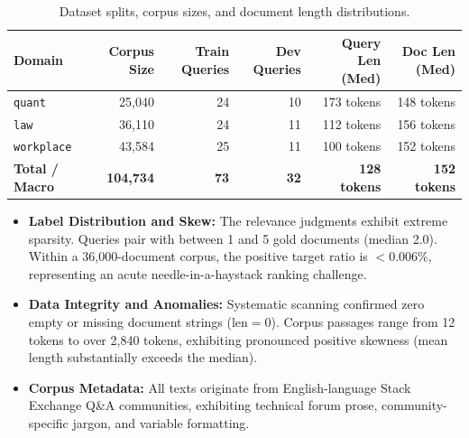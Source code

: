 \begin{table}[h]
\centering
\small
\caption{Dataset splits, corpus sizes, and document length distributions.}
\label{tab:dataset_stats}
\begin{tabular}{lrrrrr}
\toprule
\textbf{Domain} & \textbf{Corpus Size} & \textbf{Train Queries} & \textbf{Dev Queries} & \textbf{Query Len (Med)} & \textbf{Doc Len (Med)} \\
\midrule
\texttt{quant}     & 25,040 & 24 & 10 & 173 tokens & 148 tokens \\
\texttt{law}       & 36,110 & 24 & 11 & 112 tokens & 156 tokens \\
\texttt{workplace} & 43,584 & 25 & 11 & 100 tokens & 152 tokens \\
\midrule
\textbf{Total / Macro} & \textbf{104,734} & \textbf{73} & \textbf{32} & \textbf{128 tokens} & \textbf{152 tokens} \\
\bottomrule
\end{tabular}
\end{table}

\begin{itemize}
    \item \textbf{Label Distribution and Skew:} The relevance judgments exhibit extreme sparsity. Queries pair with between 1 and 5 gold documents (median 2.0). Within a 36,000-document corpus, the positive target ratio is $<0.006\%$, representing an acute needle-in-a-haystack ranking challenge.
    \item \textbf{Data Integrity and Anomalies:} Systematic scanning confirmed zero empty or missing document strings ($\text{len}=0$). Corpus passages range from 12 tokens to over 2,840 tokens, exhibiting pronounced positive skewness (mean length substantially exceeds the median).
    \item \textbf{Corpus Metadata:} All texts originate from English-language Stack Exchange Q\&A communities, exhibiting technical forum prose, community-specific jargon, and variable formatting.
\end{itemize}
